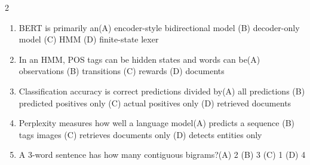 \documentclass[a4paper]{article}
\begin{document}
\begin{multicols*}{2}
\begin{enumerate}[resume]
\item BERT is primarily an\newline\hspace*{0.6em}(A) encoder-style bidirectional model \quad (B) decoder-only model \newline\hspace*{0.6em}(C) HMM \quad (D) finite-state lexer
\item In an HMM, POS tags can be hidden states and words can be\newline\hspace*{0.6em}(A) observations \quad (B) transitions \newline\hspace*{0.6em}(C) rewards \quad (D) documents
\item Classification accuracy is correct predictions divided by\newline\hspace*{0.6em}(A) all predictions \quad (B) predicted positives only \newline\hspace*{0.6em}(C) actual positives only \quad (D) retrieved documents
\item Perplexity measures how well a language model\newline\hspace*{0.6em}(A) predicts a sequence \quad (B) tags images \newline\hspace*{0.6em}(C) retrieves documents only \quad (D) detects entities only
\item A 3-word sentence has how many contiguous bigrams?\newline\hspace*{0.6em}(A) 2 \quad (B) 3 \newline\hspace*{0.6em}(C) 1 \quad (D) 4
\end{enumerate}
\end{multicols*}
\end{document}
